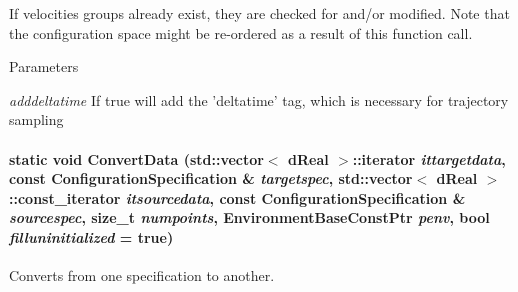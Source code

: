If velocities groups already exist, they are checked for and/or modified. Note that the configuration space might be re-\/ordered as a result of this function call. 
\begin{DoxyParams}{Parameters}
\item[{\em adddeltatime}]If true will add the 'deltatime' tag, which is necessary for trajectory sampling \end{DoxyParams}
\hypertarget{classOpenRAVE_1_1ConfigurationSpecification_a8f23d5a16201d23649d91061988091ea}{
\paragraph[{ConvertData}]{\setlength{\rightskip}{0pt plus 5cm}static void ConvertData (std::vector$<$ dReal $>$::iterator {\em ittargetdata}, \/  const {\bf ConfigurationSpecification} \& {\em targetspec}, \/  std::vector$<$ dReal $>$::const\_\-iterator {\em itsourcedata}, \/  const {\bf ConfigurationSpecification} \& {\em sourcespec}, \/  size\_\-t {\em numpoints}, \/  EnvironmentBaseConstPtr {\em penv}, \/  bool {\em filluninitialized} = {\ttfamily true})}\hfill}
\label{classOpenRAVE_1_1ConfigurationSpecification_a8f23d5a16201d23649d91061988091ea}


Converts from one specification to another. 


